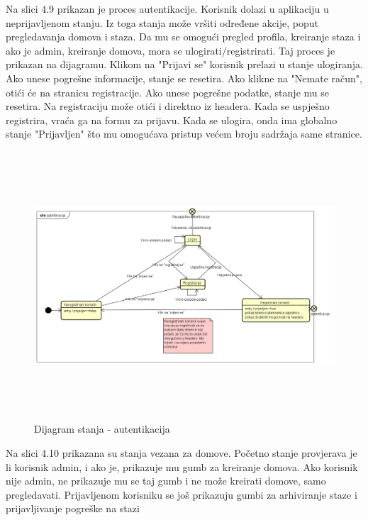 			Na slici 4.9 prikazan je proces autentikacije. Korisnik dolazi u aplikaciju u neprijavljenom stanju. Iz toga stanja može vršiti određene akcije, poput pregledavanja domova i staza. Da mu se omogući pregled profila, kreiranje staza i ako je admin, kreiranje domova, mora se ulogirati/registrirati. Taj proces je prikazan na dijagramu. Klikom na "Prijavi se" korisnik prelazi u stanje ulogiranja. Ako unese pogrešne informacije, stanje se resetira. Ako klikne na "Nemate račun", otići će na stranicu registracije. Ako unese pogrešne podatke, stanje mu se resetira. Na registraciju može otići i direktno iz headera. Kada se uspješno registrira, vraća ga na formu za prijavu. Kada se ulogira, onda ima globalno stanje "Prijavljen" što mu omogućava pristup većem broju sadržaja same stranice.
			
			\begin{figure}[H]
				\includegraphics[width=160mm,height=100mm]{dijagrami/sd-autentikacija/autentikacija.png} %
				\centering
				\caption{Dijagram stanja - autentikacija}
				\label{fig:dijagrami_stanja1}
			\end{figure}
			\newpage
			Na slici 4.10 prikazana su stanja vezana za domove. Početno stanje provjerava je li korisnik admin, i ako je, prikazuje mu gumb za kreiranje domova. Ako korisnik nije admin, ne prikazuje mu se taj gumb i ne može kreirati domove, samo pregledavati. Prijavljenom korisniku se još prikazuju gumbi za arhiviranje staze i prijavljivanje pogreške na stazi
			
